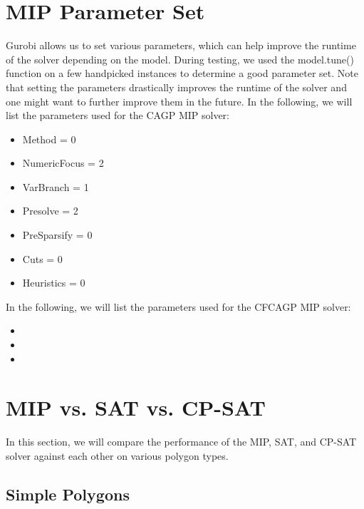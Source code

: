 \section{MIP Parameter Set}
Gurobi allows us to set various parameters, which can help improve the runtime of the solver depending on the model. During testing, we used the model.tune() function on a few handpicked instances to determine a good parameter set. Note that setting the parameters drastically improves the runtime of the solver and one might want to further improve them in the future. In the following, we will list the parameters used for the CAGP MIP solver:
\begin{itemize}
  \item Method = 0
  \item NumericFocus = 2
  \item VarBranch = 1
  \item Presolve = 2
  \item PreSparsify = 0
  \item Cuts = 0
  \item Heuristics = 0
\end{itemize}
In the following, we will list the parameters used for the CFCAGP MIP solver:
\begin{itemize}
  \item 
  \item 
  \item 
\end{itemize}

\section{MIP vs. SAT vs. CP-SAT}
In this section, we will compare the performance of the MIP, SAT, and CP-SAT solver against each other on various polygon types.

\subsection{Simple Polygons}

